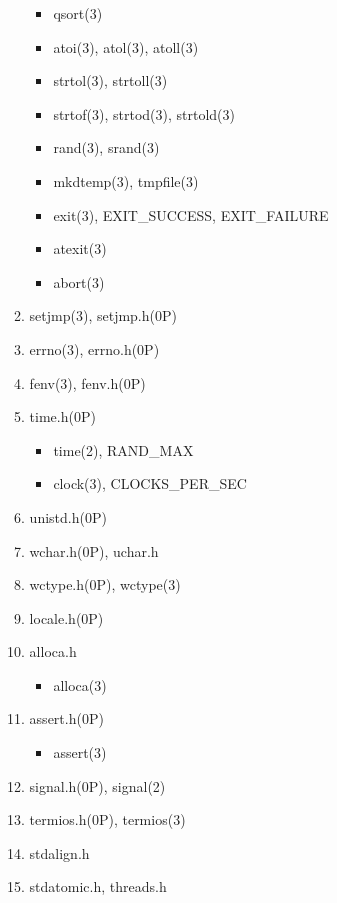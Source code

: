 \documentclass{article}
\begin{document}
\begin{enumerate}
\begin{enumerate}
\begin{itemize}
                    \item qsort(3)
                    \item atoi(3), atol(3), atoll(3)
                    \item strtol(3), strtoll(3)
                    \item strtof(3), strtod(3), strtold(3)
                    \item rand(3), srand(3)
                    \item mkdtemp(3), tmpfile(3)
                    \item exit(3), EXIT_SUCCESS, EXIT_FAILURE
                    \item atexit(3)
                    \item abort(3)
                \end{itemize}
            \item setjmp(3), setjmp.h(0P)
            \item errno(3), errno.h(0P)
            \item fenv(3), fenv.h(0P)
            \item time.h(0P)
                \begin{itemize}
                    \item time(2), RAND_MAX
                    \item clock(3), CLOCKS_PER_SEC
                \end{itemize}
            \item unistd.h(0P)
            \item wchar.h(0P), uchar.h
            \item wctype.h(0P), wctype(3)
            \item locale.h(0P)
            \item alloca.h
                \begin{itemize}
                    \item alloca(3)
                \end{itemize}
            \item assert.h(0P)
                \begin{itemize}
                    \item assert(3)
                \end{itemize}
            \item signal.h(0P), signal(2)
            \item termios.h(0P), termios(3)
            \item stdalign.h
            \item stdatomic.h, threads.h

\end{enumerate}
\end{enumerate}
\end{document}
